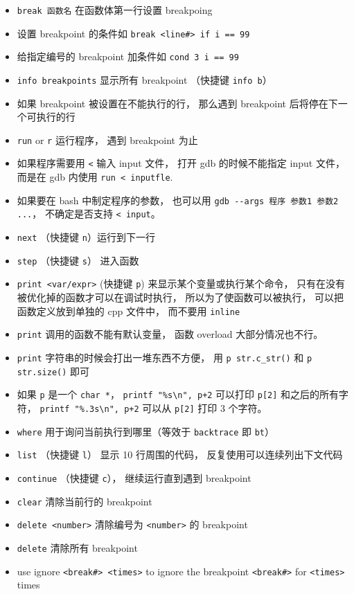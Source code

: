 \begin{itemize}
\item \verb`break 函数名` 在函数体第一行设置 breakpoing
\item 设置 breakpoint 的条件如 \verb`break <line#> if i == 99`
\item 给指定编号的 breakpoint 加条件如 \verb`cond 3 i == 99`
\item \verb`info breakpoints` 显示所有 breakpoint （快捷键 \verb`info b`）
\item 如果 breakpoint 被设置在不能执行的行， 那么遇到 breakpoint 后将停在下一个可执行的行
\item \verb`run` or \verb`r` 运行程序， 遇到 breakpoint 为止
\item 如果程序需要用 \verb`<` 输入 input 文件， 打开 gdb 的时候不能指定 input 文件， 而是在 gdb 内使用 \verb`run < inputfle`.
\item 如果要在 bash 中制定程序的参数， 也可以用 \verb`gdb --args 程序 参数1 参数2 ...`， 不确定是否支持 \verb`< input`。
\item \verb`next` （快捷键 \verb`n`）运行到下一行 
\item \verb`step` （快捷键 \verb`s`） 进入函数
\item \verb`print <var/expr>` (快捷键 \verb`p`) 来显示某个变量或执行某个命令， 只有在没有被优化掉的函数才可以在调试时执行， 所以为了使函数可以被执行， 可以把函数定义放到单独的 cpp 文件中， 而不要用 \verb`inline`
\item \verb`print` 调用的函数不能有默认变量， 函数 overload 大部分情况也不行。
\item \verb`print` 字符串的时候会打出一堆东西不方便， 用 \verb`p str.c_str()` 和 \verb`p str.size()` 即可
\item 如果 \verb`p` 是一个 \verb`char *`， \verb`printf "%s\n", p+2` 可以打印 \verb`p[2]` 和之后的所有字符， \verb`printf "%.3s\n", p+2` 可以从 \verb`p[2]` 打印 3 个字符。
\item \verb`where` 用于询问当前执行到哪里（等效于 \verb`backtrace` 即 \verb`bt`）
\item \verb`list` （快捷键 \verb`l`） 显示 10 行周围的代码， 反复使用可以连续列出下文代码
\item \verb`continue` （快捷键 \verb`c`）， 继续运行直到遇到 breakpoint
\item \verb`clear` 清除当前行的 breakpoint
\item \verb`delete <number>` 清除编号为 \verb`<number>` 的 breakpoint
\item \verb`delete` 清除所有 breakpoint
\item use ignore \verb`<break#> <times>` to ignore the breakpoint \verb`<break#>` for \verb`<times>` times

\end{itemize}
